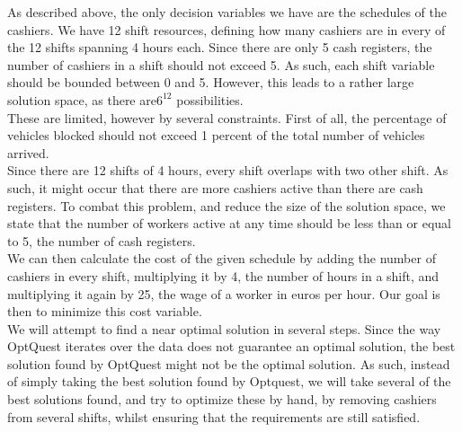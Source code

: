 As described above, the only decision variables we have are the schedules of the cashiers.
We have 12 shift resources, defining how many cashiers are in every of the 12 shifts spanning 4 hours each.
Since there are only 5 cash registers, the number of cashiers in a shift should not exceed 5.
As such, each shift variable should be bounded between 0 and 5.
However, this leads to a rather large solution space, as there are$6^{12}$ possibilities. \\
These are limited, however by several constraints.
First of all, the percentage of vehicles blocked should not exceed 1 percent of the total number of vehicles arrived. \\
Since there are 12 shifts of 4 hours, every shift overlaps with two other shift.
As such, it might occur that there are more cashiers active than there are cash registers.
To combat this problem, and reduce the size of the solution space, we state that the number of workers active at any time should be less than or equal to 5, the number of cash registers. \\
We can then calculate the cost of the given schedule by adding the number of cashiers in every shift, multiplying it by 4, the number of hours in a shift, and multiplying it again by 25, the wage of a worker in euros per hour.
Our goal is then to minimize this cost variable. \\

We will attempt to find a near optimal solution in several steps.
Since the way OptQuest iterates over the data does not guarantee an optimal solution, the best solution found by OptQuest might not be the optimal solution.
As such, instead of simply taking the best solution found by Optquest, we will take several of the best solutions found, and try to optimize these by hand, by removing cashiers from several shifts, whilst ensuring that the requirements are still satisfied. 